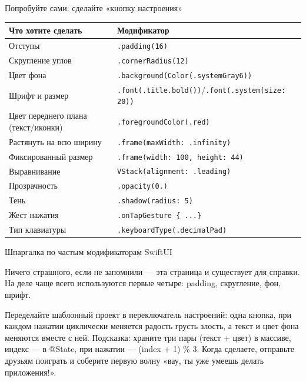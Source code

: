 \begin{tcbpractice}{Попробуйте сами: сделайте «кнопку настроения»}

\begin{center}
\begin{tabularx}{\linewidth}{|X|X|}
\hline
\textbf{Что хотите сделать} & \textbf{Модификатор} \tabularnewline
\hline
Отступы & \texttt{.\allowbreak padding(16)} \tabularnewline
Скругление углов & \texttt{.\allowbreak cornerRadius(12)} \tabularnewline
Цвет фона & \texttt{.\allowbreak background(Color(.\allowbreak systemGray6))} \tabularnewline
Шрифт и размер & \texttt{.\allowbreak font(.\allowbreak title.\allowbreak bold())}/\texttt{.\allowbreak font(.\allowbreak system(size: 20))} \tabularnewline
Цвет переднего плана (текст/иконки) & \texttt{.\allowbreak foregroundColor(.\allowbreak red)} \tabularnewline
Растянуть на всю ширину & \texttt{.\allowbreak frame(maxWidth: .\allowbreak infinity)} \tabularnewline
Фиксированный размер & \texttt{.\allowbreak frame(width: 100, height: 44)} \tabularnewline
Выравнивание & \texttt{VStack(alignment: .\allowbreak leading)} \tabularnewline
Прозрачность & \texttt{.\allowbreak opacity(0.\allowbreak 6)} \tabularnewline
Тень & \texttt{.\allowbreak shadow(radius: 5)} \tabularnewline
Жест нажатия & \texttt{.\allowbreak onTapGesture \{ .\allowbreak .\allowbreak .\allowbreak  \}} \tabularnewline
Тип клавиатуры & \texttt{.\allowbreak keyboardType(.\allowbreak decimalPad)} \tabularnewline
\hline
\end{tabularx}
\end{center}

\begin{center}\small\color{gray}Шпаргалка по частым модификаторам SwiftUI\end{center}

Ничего страшного, если не запомнили — эта страница и существует для справки. На деле чаще всего используются первые четыре: padding, скругление, фон, шрифт.

Переделайте шаблонный проект в переключатель настроений: одна кнопка, при каждом нажатии циклически меняется радость грусть злость, а текст и цвет фона меняются вместе с ней. Подсказка: храните три пары (текст + цвет) в массиве, индекс — в @State, при нажатии — (index + 1) \% 3. Когда сделаете, отправьте друзьям поиграть и соберите первую волну «вау, ты уже умеешь делать приложения!».

\end{tcbpractice}

